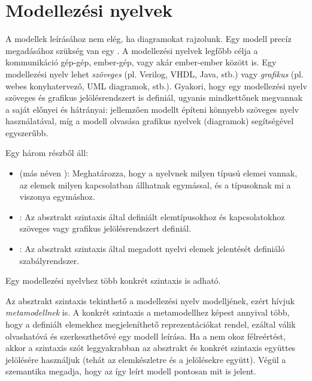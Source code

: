 
\section{Modellezési nyelvek}

A modellek leírásához nem elég, ha diagramokat rajzolunk. Egy modell precíz megadásához szükség van egy . A modellezési nyelvek legfőbb célja a kommunikáció gép-gép, ember-gép, vagy akár ember-ember között is. Egy modellezési nyelv lehet \emph{szöveges} (pl. Verilog, VHDL, Java, stb.) vagy \emph{grafikus} (pl. webes konyhatervező, UML diagramok, stb.). Gyakori, hogy egy modellezési nyelv szöveges és grafikus jelölésrendszert is definiál, ugyanis mindkettőnek megvannak a saját előnyei és hátrányai: jellemzően modellt építeni könnyebb szöveges nyelv használatával, míg a modell olvasása grafikus nyelvek (diagramok) segítségével egyszerűbb.

\begin{definicio}
	Egy  három részből áll:
	\begin{itemize}
		\item {} (más néven ): Meghatározza, hogy a nyelvnek milyen típusú elemei vannak, az elemek milyen kapcsolatban állhatnak egymással, és a típusoknak mi a viszonya egymáshoz.
		\item {}: Az absztrakt szintaxis által definiált elemtípusokhoz és kapcsolatokhoz szöveges vagy grafikus jelölésrendszert definiál.
		\item {}: Az absztrakt szintaxis által megadott nyelvi elemek jelentését definiáló szabályrendszer.
	\end{itemize}
	Egy modellezési nyelvhez több konkrét szintaxis is adható.
\end{definicio}

Az absztrakt szintaxis tekinthető a modellezési nyelv modelljének, ezért hívjuk \emph{metamodellnek} is. A konkrét szintaxis a metamodellhez képest annyival több, hogy a definiált elemekhez megjeleníthető reprezentációkat rendel, ezáltal válik olvashatóvá és szerkeszthetővé egy modell leírása. Ha a nem okoz félreértést, akkor a szintaxis szót leggyakrabban az absztrakt és konkrét szintaxis együttes jelölésére használjuk (tehát az elemkészletre és a jelölésekre együtt). Végül a szemantika megadja, hogy az így leírt modell pontosan mit is jelent. 

